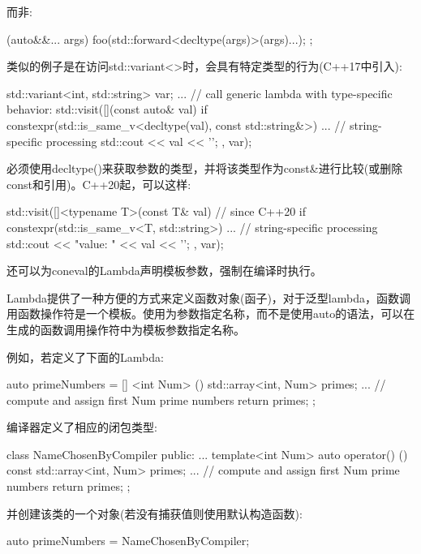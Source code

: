 而非:

\begin{cpp}
[] (auto&&... args) {
	foo(std::forward<decltype(args)>(args)...);
};
\end{cpp}

类似的例子是在访问std::variant<>时，会具有特定类型的行为(C++17中引入):

\begin{cpp}
std::variant<int, std::string> var;
...
// call generic lambda with type-specific behavior:
std::visit([](const auto& val) {
				if constexpr(std::is_same_v<decltype(val), const std::string&>) {
					... // string-specific processing
				}
				std::cout << val << '\n';
			},
			var);
\end{cpp}

必须使用decltype()来获取参数的类型，并将该类型作为const\&进行比较(或删除const和引用)。C++20起，可以这样:

\begin{cpp}
std::visit([]<typename T>(const T& val) { // since C++20
				if constexpr(std::is_same_v<T, std::string>) {
					... // string-specific processing
				}
				std::cout << "value: " << val << '\n';
			},
			var);
\end{cpp}

还可以为coneval的Lambda声明模板参数，强制在编译时执行。


Lambda提供了一种方便的方式来定义函数对象(函子)，对于泛型lambda，函数调用函数操作符是一个模板。使用为参数指定名称，而不是使用auto的语法，可以在生成的函数调用操作符中为模板参数指定名称。

例如，若定义了下面的Lambda:

\begin{cpp}
auto primeNumbers = [] <int Num> () {
						std::array<int, Num> primes{};
						... // compute and assign first Num prime numbers
						return primes;
					};
\end{cpp}

编译器定义了相应的闭包类型:

\begin{cpp}
class NameChosenByCompiler {
public:
	...
	template<int Num>
	auto operator() () const {
		std::array<int, Num> primes{};
		... // compute and assign first Num prime numbers
		return primes;
	}
};
\end{cpp}

并创建该类的一个对象(若没有捕获值则使用默认构造函数):

\begin{cpp}
auto primeNumbers = NameChosenByCompiler{};
\end{cpp}

